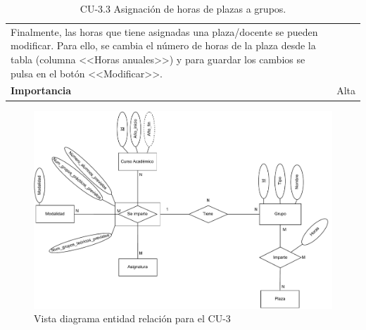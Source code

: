 \begin{table}[p]
\begin{tabularx}{\linewidth}{ p{} p{} }
		Finalmente, las horas que tiene asignadas una plaza/docente se pueden modificar. Para ello, se cambia el número de horas de la plaza desde la tabla (columna <<Horas anuales>>) y para guardar los cambios se pulsa en el botón <<Modificar>>. \\
		\textbf{Importancia}          & Alta \\
		\bottomrule
	\end{tabularx}
	\caption{CU-3.3 Asignación de horas de plazas a grupos.}
\end{table}
\FloatBarrier

\begin{figure}[!h]
	\centering
	\includegraphics[scale=0.8]{../img/Anexos/Casos uso/Vistas ER/Diagrama E-R CU 3.pdf}
	\caption{Vista diagrama entidad relación para el CU-3}\label{er_cu3}
\end{figure}
\FloatBarrier

\newpage
